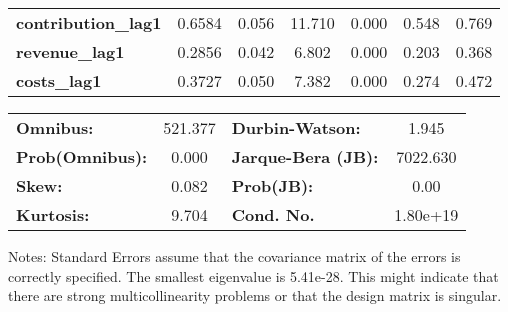 \begin{center}
\begin{tabular}{lcccccc}
\textbf{contribution\_lag1}               &       0.6584  &        0.056     &    11.710  &         0.000        &        0.548    &        0.769     \\
\textbf{revenue\_lag1}                    &       0.2856  &        0.042     &     6.802  &         0.000        &        0.203    &        0.368     \\
\textbf{costs\_lag1}                      &       0.3727  &        0.050     &     7.382  &         0.000        &        0.274    &        0.472     \\
\bottomrule
\end{tabular}
\begin{tabular}{lclc}
\textbf{Omnibus:}       & 521.377 & \textbf{  Durbin-Watson:     } &    1.945  \\
\textbf{Prob(Omnibus):} &   0.000 & \textbf{  Jarque-Bera (JB):  } & 7022.630  \\
\textbf{Skew:}          &   0.082 & \textbf{  Prob(JB):          } &     0.00  \\
\textbf{Kurtosis:}      &   9.704 & \textbf{  Cond. No.          } & 1.80e+19  \\
\bottomrule
\end{tabular}
\end{center}

Notes: \newline
 [1] Standard Errors assume that the covariance matrix of the errors is correctly specified. \newline
 [2] The smallest eigenvalue is 5.41e-28. This might indicate that there are \newline
 strong multicollinearity problems or that the design matrix is singular.